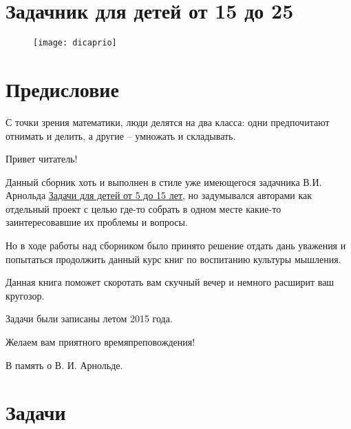 \addtocounter{oldsection}{\value{section}}
\setcounter{section}{0}

\section*{Задачник для детей от 15 до 25} %
\begin{figure}[ht!]
    \centering
    \texttt{[image: dicaprio]}
\end{figure}
\label{mietka}
\section*{Предисловие}

\begin{epigraph}
    С точки зрения математики, люди делятся на два класса: одни предпочитают отнимать и делить, а 
    другие -- умножать и складывать.
\end{epigraph}

Привет читатель!

Данный сборник хоть и выполнен в стиле уже имеющегося задачника
В.И. Арнольда \href{http://ilib.mccme.ru/pdf/VIA-taskbook.pdf}{Задачи для детей от 5 до 15 лет}, но задумывался
авторами как отдельный проект с целью где-то собрать в одном месте
какие-то заинтересовавшие их проблемы и вопросы.

Но в ходе работы над сборником было принято решение отдать дань
уважения и попытаться продолжить данный курс книг по воспитанию
культуры мышления.

Данная книга поможет скоротать вам скучный вечер и немного расширит ваш кругозор.

Задачи были записаны летом 2015 года.

Желаем вам приятного времяпреповождения!

В память о В. И. Арнольде.

\section{Задачи}
